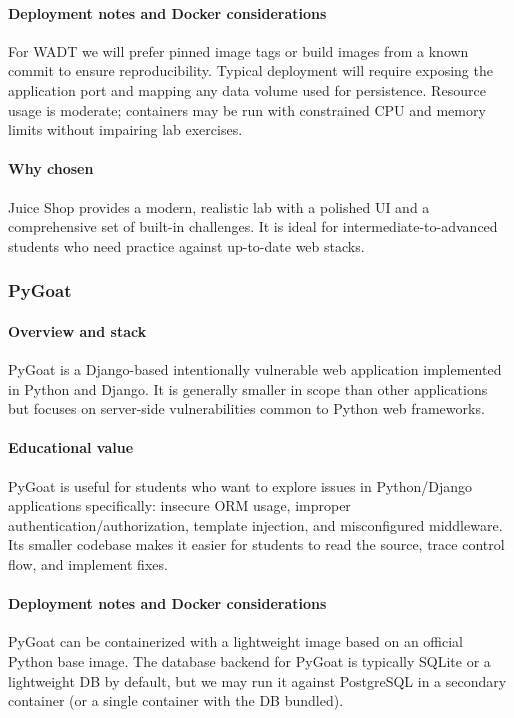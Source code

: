 \documentclass[12pt]{article}
\begin{document}
\paragraph{Deployment notes and Docker considerations}
For WADT we will prefer pinned image tags or build images from a known commit to ensure reproducibility. Typical deployment will require exposing the application port and mapping any data volume used for persistence. Resource usage is moderate; containers may be run with constrained CPU and memory limits without impairing lab exercises.

\paragraph{Why chosen}
Juice Shop provides a modern, realistic lab with a polished UI and a comprehensive set of built-in challenges. It is ideal for intermediate-to-advanced students who need practice against up-to-date web stacks.


\subsubsection{PyGoat}

\paragraph{Overview and stack}
PyGoat is a Django-based intentionally vulnerable web application implemented in Python and Django. It is generally smaller in scope than other applications but focuses on server-side vulnerabilities common to Python web frameworks.

\paragraph{Educational value}
PyGoat is useful for students who want to explore issues in Python/Django applications specifically: insecure ORM usage, improper authentication/authorization, template injection, and misconfigured middleware. Its smaller codebase makes it easier for students to read the source, trace control flow, and implement fixes.

\paragraph{Deployment notes and Docker considerations}
PyGoat can be containerized with a lightweight image based on an official Python base image. The database backend for PyGoat is typically SQLite or a lightweight DB by default, but we may run it against PostgreSQL in a secondary container (or a single container with the DB bundled).
\end{document}
